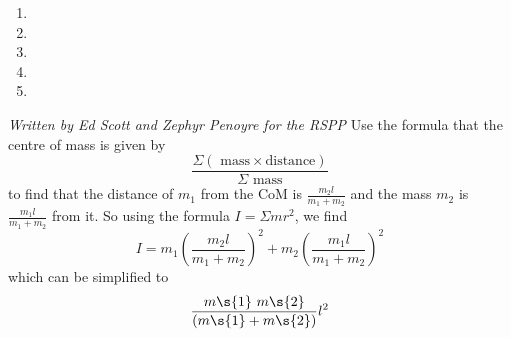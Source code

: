 
\begin{problem} 
{
\begin{enumerate}
	\item {}
	\item {}
	\item {}\correct
	\item {}
	\item {}
\end{enumerate}}
{\textit{Written by Ed Scott and Zephyr Penoyre for the RSPP}}
{
Use the formula that the centre of mass is given by 
\begin{equation*} \frac{\Sigma (\textrm{ mass}\times \textrm{distance})}{\Sigma \textrm{ mass}} \end{equation*}
to find that the distance of $m_1$ from the CoM is $\frac{m_2l}{m_1+m_2}$ and the mass $m_2$ is $\frac{m_1l}{m_1+m_2}$ from it. So using the formula $I=\Sigma mr^2$, we find 
\begin{equation*} I=m_1\left(\frac{m_2l}{m_1+m_2}\right)^2+m_2\left(\frac{m_1l}{m_1+m_2}\right)^2 \end{equation*}
which can be simplified to \begin{equation*}\frac{m\s{1}~ m\s{2}}{(m\s{1} + m\s{2})} l^2\end{equation*}
}
\end{problem}